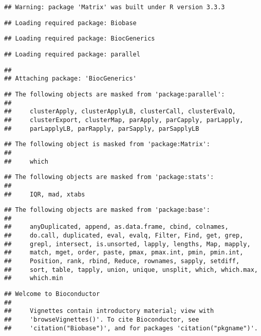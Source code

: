 \documentclass[]{article}
\begin{document}
\begin{verbatim}
## Warning: package 'Matrix' was built under R version 3.3.3
\end{verbatim}

\begin{verbatim}
## Loading required package: Biobase
\end{verbatim}

\begin{verbatim}
## Loading required package: BiocGenerics
\end{verbatim}

\begin{verbatim}
## Loading required package: parallel
\end{verbatim}

\begin{verbatim}
## 
## Attaching package: 'BiocGenerics'
\end{verbatim}

\begin{verbatim}
## The following objects are masked from 'package:parallel':
## 
##     clusterApply, clusterApplyLB, clusterCall, clusterEvalQ,
##     clusterExport, clusterMap, parApply, parCapply, parLapply,
##     parLapplyLB, parRapply, parSapply, parSapplyLB
\end{verbatim}

\begin{verbatim}
## The following object is masked from 'package:Matrix':
## 
##     which
\end{verbatim}

\begin{verbatim}
## The following objects are masked from 'package:stats':
## 
##     IQR, mad, xtabs
\end{verbatim}

\begin{verbatim}
## The following objects are masked from 'package:base':
## 
##     anyDuplicated, append, as.data.frame, cbind, colnames,
##     do.call, duplicated, eval, evalq, Filter, Find, get, grep,
##     grepl, intersect, is.unsorted, lapply, lengths, Map, mapply,
##     match, mget, order, paste, pmax, pmax.int, pmin, pmin.int,
##     Position, rank, rbind, Reduce, rownames, sapply, setdiff,
##     sort, table, tapply, union, unique, unsplit, which, which.max,
##     which.min
\end{verbatim}

\begin{verbatim}
## Welcome to Bioconductor
## 
##     Vignettes contain introductory material; view with
##     'browseVignettes()'. To cite Bioconductor, see
##     'citation("Biobase")', and for packages 'citation("pkgname")'.
\end{verbatim}
\end{document}
